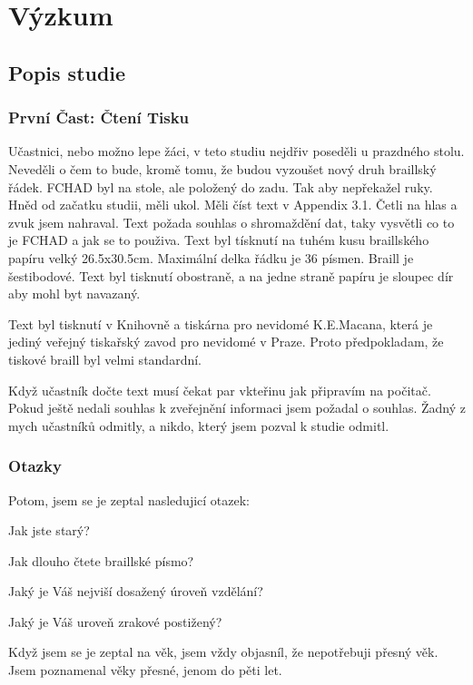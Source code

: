 \chapter{Výzkum}

\section{Popis studie}

\subsection{První Čast: Čtení Tisku}

Učastnici, nebo možno lepe žáci, v teto studiu nejdřiv poseděli u prazdného stolu.  Neveděli o čem to bude, kromě tomu, že budou vyzoušet nový druh braillský řádek.  FCHAD byl na stole, ale položený do zadu. Tak aby nepřekažel ruky.  Hněd od začatku studii, měli ukol.  Měli číst text v Appendix 3.1.  Četli na hlas a zvuk jsem nahraval.  Text požada souhlas o shromaždění dat, taky vysvětli co to je FCHAD a jak se to použiva. Text byl tísknutí na tuhém kusu braillského papíru velký 26.5x30.5cm.  Maximální delka řádku je 36 písmen.  Braill je šestibodové.  Text byl tisknutí obostraně, a na jedne straně papíru je sloupec dír aby mohl byt navazaný.

Text byl tisknutí v Knihovně a tiskárna pro nevidomé K.E.Macana, která je jediný veřejný tiskařský zavod pro nevidomé v Praze.  Proto předpokladam, že tiskové braill byl velmi standardní.

Když učastník dočte text musí čekat par vkteřinu jak připravím na počitač. Pokud ještě nedali souhlas k zveřejnění informaci jsem požadal o souhlas.  Žadný z mych učastníků odmitly, a nikdo, který jsem pozval k studie odmitl.

\subsection{Otazky}

 Potom, jsem se je zeptal nasledujicí otazek:

Jak jste starý?

Jak dlouho čtete braillské písmo?

Jaký je Váš nejviší dosažený úroveň vzdělání?

Jaký je Váš uroveň zrakové postižený?

Když jsem se je zeptal na věk, jsem vždy objasníl, že nepotřebuji přesný věk.  Jsem poznamenal věky přesné, jenom do pěti let.

